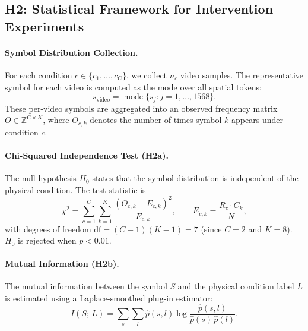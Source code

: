 \documentclass{article}
\begin{document}
\subsection{H2: Statistical Framework for Intervention Experiments}

\paragraph{Symbol Distribution Collection.}
For each condition $c \in \{c_1, \ldots, c_C\}$, we collect $n_c$ video
samples.  The representative symbol for each video is computed as the mode over
all spatial tokens:
%
\begin{equation}
  s_{\text{video}}
  = \operatorname{mode}\bigl\{s_j : j = 1, \ldots, 1568\bigr\}.
\end{equation}
%
These per-video symbols are aggregated into an observed frequency matrix
$O \in \mathbb{Z}^{C \times K}$, where $O_{c,k}$ denotes the number of times
symbol $k$ appears under condition $c$.

\paragraph{Chi-Squared Independence Test (H2a).}
The null hypothesis $H_0$ states that the symbol distribution is independent
of the physical condition.  The test statistic is
%
\begin{equation}
  \chi^2
  = \sum_{c=1}^{C}\sum_{k=1}^{K}
    \frac{(O_{c,k} - E_{c,k})^2}{E_{c,k}},
  \qquad
  E_{c,k} = \frac{R_c \cdot C_k}{N},
\end{equation}
%
with degrees of freedom $\mathrm{df} = (C-1)(K-1) = 7$ (since $C = 2$ and
$K = 8$).  $H_0$ is rejected when $p < 0.01$.

\paragraph{Mutual Information (H2b).}
The mutual information between the symbol $S$ and the physical condition label
$L$ is estimated using a Laplace-smoothed plug-in estimator:
%
\begin{equation}
  I(S;\,L)
  = \sum_{s}\sum_{l}
    \hat{p}(s,l)\log\frac{\hat{p}(s,l)}{\hat{p}(s)\,\hat{p}(l)}.
\end{equation}
\end{document}
